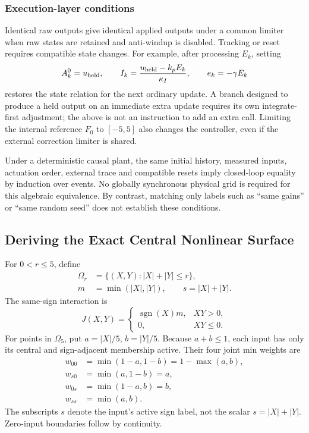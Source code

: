 \subsubsection{Execution-layer conditions}
Identical raw outputs give identical applied outputs under a common
limiter when raw states are retained and anti-windup is disabled.
Tracking or reset requires compatible state changes. For example, after
processing $E_k$, setting
\[
 A^0_k=u_{\rm held},\qquad
 I_k=\frac{u_{\rm held}-k_pE_k}{\kappa_I},\qquad
 e_k=-\gamma E_k
\]
restores the state relation for the next ordinary update. A branch designed
to produce a held output on an immediate extra update requires its own
integrate-first adjustment; the above is not an instruction to add an
extra call. Limiting the internal reference $F_0$ to $[-5,5]$ also changes
the controller, even if the external correction limiter is shared.

Under a deterministic causal plant, the same initial history, measured
inputs, actuation order, external trace and compatible resets imply
closed-loop equality by induction over events. No globally synchronous
physical grid is required for this algebraic equivalence. By contrast,
matching only labels such as ``same gains'' or ``same random seed'' does
not establish these conditions.

\subsection{Deriving the Exact Central Nonlinear Surface}
\label{detail:subsec:fpi_mechanism}

For $0<r\le5$, define
\begin{align}
 \Omega_r&=\{(X,Y):|X|+|Y|\le r\},\nonumber\\
 m&=\min(|X|,|Y|),\qquad s=|X|+|Y|.
 \label{detail:eq:fpi_domain}
\end{align}
The same-sign interaction is
\begin{equation}
 J(X,Y)=\begin{cases}\operatorname{sgn}(X)m,&XY>0,\\0,&XY\le0.\end{cases}
 \label{detail:eq:fpi_interaction}
\end{equation}
For points in $\Omega_5$, put $a=|X|/5$, $b=|Y|/5$.
Because $a+b\le1$, each input has only its central and sign-adjacent
membership active. Their four joint min weights are
\begin{align}
 w_{00}&=\min(1-a,1-b)=1-\max(a,b),\nonumber\\
 w_{s0}&=\min(a,1-b)=a,\nonumber\\
 w_{0s}&=\min(1-a,b)=b,\nonumber\\
 w_{ss}&=\min(a,b).
 \label{detail:eq:fpd_four_weights}
\end{align}
The subscripts $s$ denote the input's active sign label, not the scalar
$s=|X|+|Y|$. Zero-input boundaries follow by continuity.

